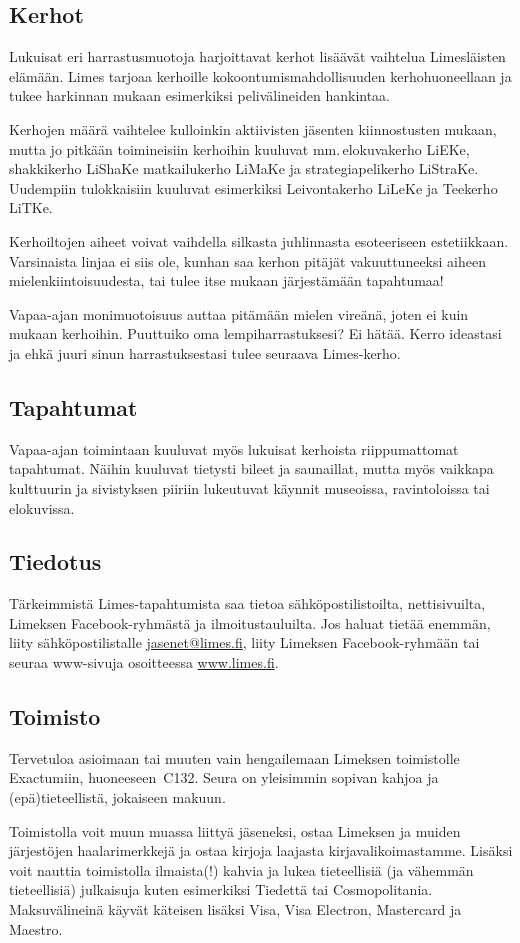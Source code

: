 \documentclass[a5paper, 8pt, twocolumn]{book} %
\numberwithin{equation}{section}
\begin{document}
\subsection*{Kerhot}
Lukuisat eri harrastusmuotoja harjoittavat kerhot lisäävät vaihtelua Limesläisten
elämään. Limes tarjoaa
kerhoille kokoontumismahdollisuuden kerhohuoneellaan
ja tukee harkinnan mukaan
esimerkiksi pelivälineiden hankintaa.

Kerhojen määrä vaihtelee kulloinkin
aktiivisten jäsenten kiinnostusten mukaan,
mutta jo pitkään toimineisiin kerhoihin
kuuluvat mm.\,elokuvakerho LiEKe, shakkikerho
LiShaKe matkailukerho LiMaKe
ja strategiapelikerho LiStraKe. Uudempiin
tulokkaisiin kuuluvat esimerkiksi Leivontakerho
LiLeKe ja Teekerho LiTKe.

Kerhoiltojen aiheet voivat vaihdella silkasta
juhlinnasta esoteeriseen estetiikkaan.
Varsinaista linjaa ei siis ole, kunhan saa
kerhon pitäjät vakuuttuneeksi aiheen mielenkiintoisuudesta,
tai tulee itse mukaan
järjestämään tapahtumaa!

Vapaa-ajan monimuotoisuus auttaa pitämään
mielen vireänä, joten ei kuin mukaan
kerhoihin. Puuttuiko oma lempiharrastuksesi?
Ei hätää. Kerro ideastasi ja ehkä
juuri sinun harrastuksestasi tulee seuraava
Limes-kerho.
\subsection*{Tapahtumat}
Vapaa-ajan toimintaan kuuluvat myös
lukuisat kerhoista riippumattomat tapahtumat.
Näihin kuuluvat tietysti bileet ja saunaillat,
mutta myös vaikkapa kulttuurin ja
sivistyksen piiriin lukeutuvat käynnit museoissa,
ravintoloissa tai elokuvissa.
\subsection*{Tiedotus}
Tärkeimmistä Limes-tapahtumista saa
tietoa sähköpostilistoilta, nettisivuilta, Limeksen
Facebook-ryhmästä ja ilmoitustauluilta.
Jos haluat tietää enemmän,
liity sähköpostilistalle \url{jasenet@limes.fi},
liity Limeksen Facebook-ryhmään tai seuraa
www-sivuja osoitteessa \url{www.limes.fi}.
\subsection*{Toimisto}
Tervetuloa asioimaan tai muuten vain
hengailemaan Limeksen toimistolle Exactumiin,
huoneeseen~C132. Seura on yleisimmin
sopivan kahjoa ja (epä)tieteellistä,
jokaiseen makuun.

Toimistolla voit muun muassa liittyä jäseneksi,
ostaa Limeksen ja muiden järjestöjen
haalarimerkkejä ja ostaa kirjoja laajasta
kirjavalikoimastamme. Lisäksi voit nauttia
toimistolla ilmaista(!) kahvia ja lukea tieteellisiä
(ja vähemmän tieteellisiä) julkaisuja
kuten esimerkiksi Tiedettä tai Cosmopolitania.
Maksuvälineinä käyvät käteisen
lisäksi Visa, Visa Electron, Mastercard ja
Maestro.
\end{document}
